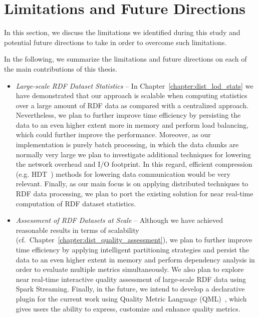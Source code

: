 \section{Limitations and Future Directions}
In this section, we discuss the limitations we identified during this study and potential future directions to take in order to overcome such limitations.

In the following, we summarize the limitations and future directions on each of the main contributions of this thesis.

\begin{itemize}
    \item \textit{Large-scale \gls{RDF} Dataset Statistics} --
    In Chapter~\ref{chapter:dist_lod_stats} we have demonstrated that our approach is scalable when computing statistics over a large amount of \gls{RDF} data as compared with a centralized approach.
    Nevertheless, we plan to further improve time efficiency by persisting the data to an even higher extent more in memory and perform load balancing, which could further improve the performance.
    Moreover, as our implementation is purely batch processing, in which the data chunks are normally very large we plan to investigate additional techniques for lowering the network overhead and I/O footprint.
    In this regard, efficient compression (e.g. \gls{HDT}~\cite{HDTFernandez2013}) methods for lowering data communication would be very relevant.
    Finally, as our main focus is on applying distributed techniques to \gls{RDF} data processing, we plan to port the existing solution for near real-time computation of \gls{RDF} dataset statistics.

    \item \textit{Assessment of \gls{RDF} Datasets at Scale} -- 
    Although we have achieved reasonable results in terms of scalability (cf.\ Chapter~\ref{chapter:dist_quality_assessment}), we plan to further improve time efficiency by applying intelligent partitioning strategies and persist the data to an even higher extent in memory and perform dependency analysis in order to evaluate multiple metrics simultaneously. 
    We also plan to explore near real-time interactive quality assessment of large-scale \gls{RDF} data using Spark Streaming.
    Finally, in the future, we intend to develop a declarative plugin for the current work using Quality Metric Language (QML)~\cite{debattista2016luzzu}, which gives users the ability to express, customize and enhance quality metrics.
    

\end{itemize}

